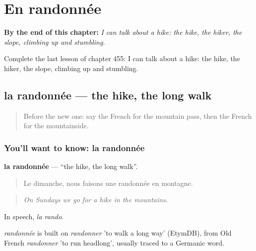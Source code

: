 
\chapter{En randonnée}
\label{ch:fr-en-randonnee}

\begin{chapteropening}
\textbf{By the end of this chapter:} \emph{I can talk about a hike: the hike, the hiker, the slope, climbing up and stumbling.}

Complete the last lesson of chapter 455: I can talk about a hike: the hike, the hiker, the slope, climbing up and stumbling.
\end{chapteropening}

\section[la randonnée]{la randonnée — the hike, the long walk}

\label{lesson:FR-C455-randonnee}



\begin{quote}
Before the new one: say the French for the mountain pass, then the French for the mountainside.
\end{quote}

\subsection*{You'll want to know: la randonnée}
\textbf{la randonnée} — \textquotedblleft{}the hike, the long walk\textquotedblright{}.

\begin{quote}
Le dimanche, nous faisons une randonnée en montagne.
\end{quote}

\begin{quote}
\emph{On Sundays we go for a hike in the mountains.}
\end{quote}

In speech, \emph{la rando}.

\begin{cousinweb}
\emph{randonnée} is built on \emph{randonner} 'to walk a long way' (EtymDB), from Old French \emph{randonner} 'to run headlong', usually traced to a Germanic word.
\end{cousinweb}

